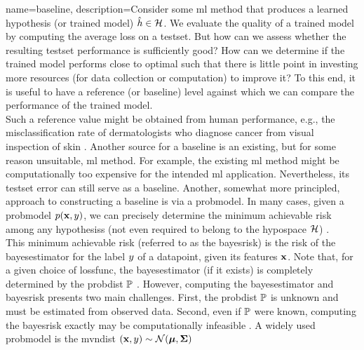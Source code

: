 {name={baseline},
	description={Consider some \gls{ml} method that produces a learned 
    		\gls{hypothesis} (or trained \gls{model}) $\hat{h} \in \mathcal{H}$. We evaluate the quality of a trained \gls{model} 
    		by computing the average \gls{loss} on a \gls{testset}. But how can we assess 
    		whether the resulting \gls{testset} performance is sufficiently good? How can we 
    		determine if the trained \gls{model} performs close to optimal such that there is little point 
   		in investing more resources (for \gls{data} collection or computation) to improve it? 
    		To this end, it is useful to have a reference (or baseline) level against which 
    		we can compare the performance of the trained \gls{model}. \\
		Such a reference value might be obtained from human performance, e.g., the misclassification rate of dermatologists 
    		who diagnose cancer from visual inspection of skin \cite{SkinHumanAI}. Another source for a baseline is an existing, 
    		but for some reason unsuitable, \gls{ml} method. For example, the existing \gls{ml} method 
    		might be computationally too expensive for the intended \gls{ml} application. 
    		Nevertheless, its \gls{testset} error can still serve as a baseline. Another, somewhat more principled, 
    		approach to constructing a baseline is via a \gls{probmodel}. In many cases, given a \gls{probmodel} $p({\bf x},y)$,  
    		we can precisely determine the \gls{minimum} achievable \gls{risk} among any \glspl{hypothesis}
    		(not even required to belong to the \gls{hypospace} $\mathcal{H}$) \cite{LC}. \\
    		This \gls{minimum} achievable \gls{risk} (referred to as the \gls{bayesrisk}) is the \gls{risk} 
    		of the \gls{bayesestimator} for the \gls{label} $y$ of a \gls{datapoint}, given
    		its \glspl{feature} ${\bf x}$. Note that, for a given choice of \gls{lossfunc}, the 
    		\gls{bayesestimator} (if it exists) is completely determined by the \gls{probdist} 
		$\mathbb{P}$ \cite[Ch. 4]{LC}. However, computing the \gls{bayesestimator} 
		and \gls{bayesrisk} presents two main challenges. First, the \gls{probdist} 
		$\mathbb{P}$ is unknown and must be estimated from observed \gls{data}. Second, even if $\mathbb{P}$ 
		were known, computing the \gls{bayesrisk} exactly may be computationally 
		infeasible \cite{cooper1990computational}. 
		A widely used \gls{probmodel} is the \gls{mvndist} $\left( {\bf x},y \right) \sim \mathcal{N}({\bm \mu},{\bm \Sigma})$ 
}}
